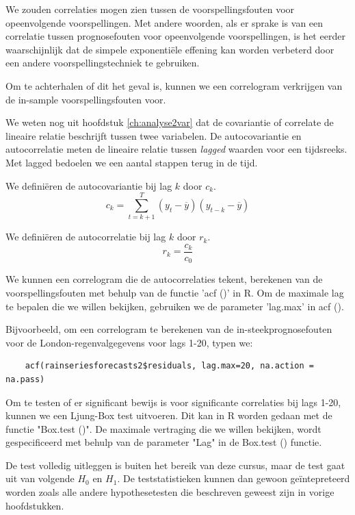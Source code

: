 We zouden correlaties mogen zien tussen de voorspellingsfouten voor opeenvolgende voorspellingen. Met andere woorden, als er sprake is van een correlatie tussen prognosefouten voor opeenvolgende voorspellingen, is het eerder waarschijnlijk dat de simpele exponentiële effening kan worden verbeterd door een andere voorspellingstechniek te gebruiken.

Om te achterhalen of dit het geval is, kunnen we een correlogram verkrijgen van de in-sample voorspellingsfouten voor.

We weten nog uit hoofdstuk \ref{ch:analyse2var} dat de covariantie of correlate de lineaire relatie beschrijft tussen twee variabelen. De autocovariantie en autocorrelatie meten de lineaire relatie tussen \textit{lagged} waarden voor een tijdsreeks. Met lagged bedoelen we een aantal stappen terug in de tijd.

\begin{definition}[Autocovariantie]
	We defini\"eren de autocovariantie bij lag $k$ door $c_k$.
	\[ c_k = \sum_{t=k+1}^{T} (y_t - \overline{y})(y_{t-k} - \overline{y}) \]
\end{definition}

\begin{definition}[Autocorrelatie]
	We defini\"eren de autocorrelatie bij lag $k$ door $r_k$.
	\[ r_k = \frac{c_k}{c_0} \]
\end{definition}

 We kunnen een correlogram die de autocorrelaties tekent, berekenen van de voorspellingsfouten met behulp van de functie 'acf ()' in R. Om de maximale lag te bepalen die we willen bekijken, gebruiken we de parameter 'lag.max' in acf ().

Bijvoorbeeld, om een correlogram te berekenen van de in-steekprognosefouten voor de London-regenvalgegevens voor lags 1-20, typen we:

\begin{lstlisting}
	acf(rainseriesforecasts2$residuals, lag.max=20, na.action = na.pass)
\end{lstlisting}

Om te testen of er significant bewijs is voor significante correlaties bij lags 1-20, kunnen we een Ljung-Box test uitvoeren. Dit kan in R worden gedaan met de functie "Box.test ()". De maximale vertraging die we willen bekijken, wordt gespecificeerd met behulp van de parameter "Lag" in de Box.test () functie.

De test volledig uitleggen is buiten het bereik van deze cursus, maar de test gaat uit van volgende $H_0$ en $H_1$. De teststatistieken kunnen dan gewoon ge\"intepreteerd worden zoals alle andere hypothesetesten die beschreven geweest zijn in vorige hoofdstukken. 

